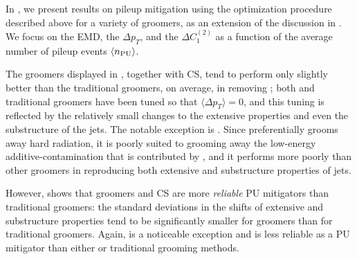 \begin{subappendices}
In , we present results on \gls{pileup} mitigation using the optimization procedure described above for a variety of groomers, as an extension of the discussion in .
%
We focus on the  EMD, the  \(\Delta p_T\), and the  \(\Delta C_1^{(2)}\) as a function of the average number of \gls{pileup} events \(\langle n_{\rm PU} \rangle\).

The \PIRANHA{} groomers displayed in , together with CS, tend to perform only slightly better than the traditional groomers, on average, in removing ;
%
both \PIRANHA{} and traditional groomers have been tuned so that \(\langle \Delta p_T\rangle=0\), and this tuning is reflected by the relatively small changes to the extensive properties and even the substructure of the  jets.
%
The notable exception is .
%
Since  preferentially grooms away hard radiation, it is poorly suited to grooming away the low-energy \gls{additive-contamination} that is contributed by , and it performs more poorly than other \PIRANHA{} groomers in reproducing both extensive and substructure properties of  jets.

However,  shows that \PIRANHA{} groomers and CS are more \textit{reliable} PU mitigators than traditional groomers:
%
the standard deviations in the shifts of  extensive and substructure properties tend to be significantly smaller for \PIRANHA{} groomers than for traditional groomers.
%
Again,  is a noticeable exception and is less reliable as a PU mitigator than either \PIRANHA{} or traditional grooming methods.



\end{subappendices}

